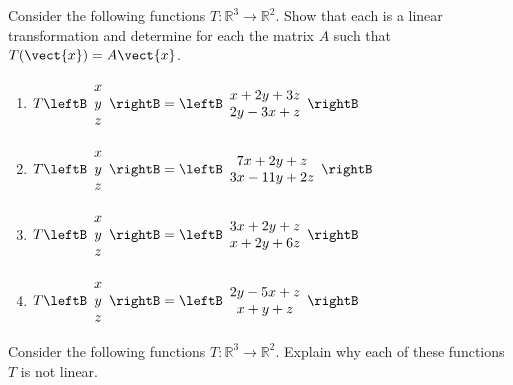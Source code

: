 \begin{enumialphparenastyle}
\begin{ex} Consider the following functions $T:\mathbb{R}^{3}\rightarrow \mathbb{R}^{2}$.
Show that each is a linear transformation and determine for each the matrix $A$ such that 
$T(\vect{x})=A\vect{x}$.

\begin{enumerate}
\item $T\leftB
\begin{array}{c}
x \\
y \\
z
\end{array}
\rightB =\leftB
\begin{array}{c}
x+2y+3z \\
2y-3x+z
\end{array}
\rightB $

\item $T\leftB
\begin{array}{c}
x \\
y \\
z
\end{array}
\rightB =\leftB
\begin{array}{c}
7x+2y+z \\
3x-11y+2z
\end{array}
\rightB $

\item $T\leftB
\begin{array}{c}
x \\
y \\
z
\end{array}
\rightB =\leftB
\begin{array}{c}
3x+2y+z \\
x+2y+6z
\end{array}
\rightB $

\item $T\leftB
\begin{array}{c}
x \\
y \\
z
\end{array}
\rightB =\leftB
\begin{array}{c}
2y-5x+z \\
x+y+z
\end{array}
\rightB $
\end{enumerate}
\end{ex}

\begin{ex} Consider the following functions $T:\mathbb{R}^{3}\rightarrow \mathbb{R}^{2}.$
Explain why each of these functions $T$ is not linear.


\end{ex}
\end{enumialphparenastyle}
